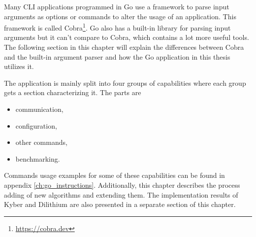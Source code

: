 Many CLI applications programmed in Go use a framework to parse input arguments as options or commands to alter the usage of an application. This framework is called Cobra\footnote{\url{https://cobra.dev}}. Go also has a built-in library for parsing input arguments but it can't compare to Cobra, which contains a lot more useful tools. The following section in this chapter will explain the differences between Cobra and the built-in argument parser and how the Go application in this thesis utilizes it.

The application is mainly split into four groups of capabilities where each group gets a section characterizing it. The parts are
\begin{itemize}
  \item communication,
  \item configuration,
  \item other commands,
  \item benchmarking.
\end{itemize}
\noindent Commands usage examples for some of these capabilities can be found in appendix \ref{ch:go_instructions}. Additionally, this chapter describes the process adding of new algorithms and extending them. The implementation results of Kyber and Dilithium are also presented in a separate section of this chapter.
